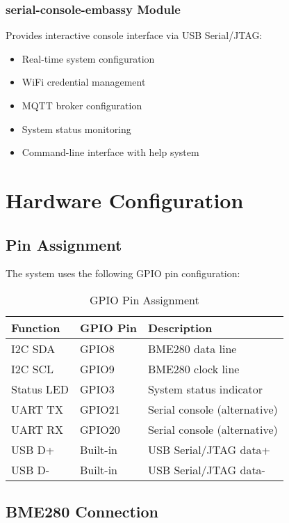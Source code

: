 \documentclass[12pt,a4paper]{article}
\begin{document}
\subsubsection{serial-console-embassy Module}
Provides interactive console interface via USB Serial/JTAG:
\begin{itemize}
    \item Real-time system configuration
    \item WiFi credential management
    \item MQTT broker configuration
    \item System status monitoring
    \item Command-line interface with help system
\end{itemize}

\section{Hardware Configuration}

\subsection{Pin Assignment}

The system uses the following GPIO pin configuration:

\begin{table}[h!]
\centering
\begin{tabular}{@{}lll@{}}
\toprule
\textbf{Function} & \textbf{GPIO Pin} & \textbf{Description} \\
\midrule
I2C SDA & GPIO8 & BME280 data line \\
I2C SCL & GPIO9 & BME280 clock line \\
Status LED & GPIO3 & System status indicator \\
UART TX & GPIO21 & Serial console (alternative) \\
UART RX & GPIO20 & Serial console (alternative) \\
USB D+ & Built-in & USB Serial/JTAG data+ \\
USB D- & Built-in & USB Serial/JTAG data- \\
\bottomrule
\end{tabular}
\caption{GPIO Pin Assignment}
\label{tab:gpio}
\end{table}

\subsection{BME280 Connection}
\end{document}
